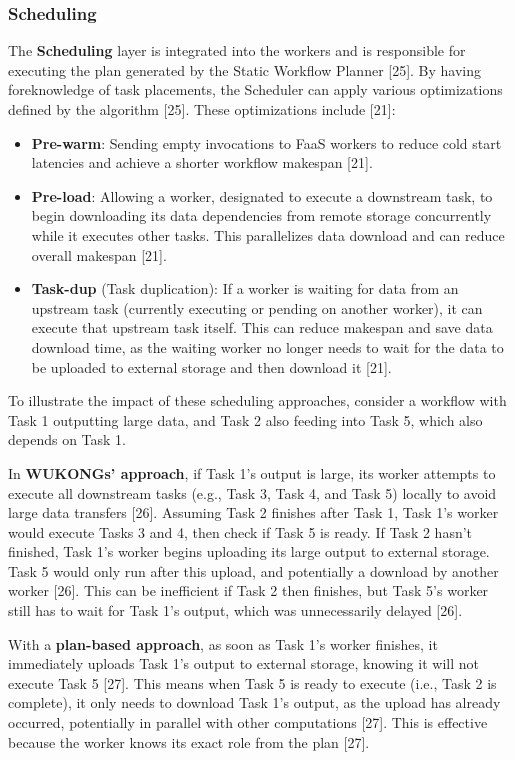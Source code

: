 \documentclass[conference]{IEEEtran}
\begin{document}
\subsubsection{Scheduling}
The \textbf{Scheduling} layer is integrated into the workers and is responsible for executing the plan generated by the Static Workflow Planner [25]. By having foreknowledge of task placements, the Scheduler can apply various optimizations defined by the algorithm [25]. These optimizations include [21]:
\begin{itemize}
    \item \textbf{Pre-warm}: Sending empty invocations to FaaS workers to reduce cold start latencies and achieve a shorter workflow makespan [21].
    \item \textbf{Pre-load}: Allowing a worker, designated to execute a downstream task, to begin downloading its data dependencies from remote storage concurrently while it executes other tasks. This parallelizes data download and can reduce overall makespan [21].
    \item \textbf{Task-dup} (Task duplication): If a worker is waiting for data from an upstream task (currently executing or pending on another worker), it can execute that upstream task itself. This can reduce makespan and save data download time, as the waiting worker no longer needs to wait for the data to be uploaded to external storage and then download it [21].
\end{itemize}

To illustrate the impact of these scheduling approaches, consider a workflow with Task 1 outputting large data, and Task 2 also feeding into Task 5, which also depends on Task 1.

In \textbf{WUKONGs' approach}, if Task 1's output is large, its worker attempts to execute all downstream tasks (e.g., Task 3, Task 4, and Task 5) locally to avoid large data transfers [26]. Assuming Task 2 finishes after Task 1, Task 1's worker would execute Tasks 3 and 4, then check if Task 5 is ready. If Task 2 hasn't finished, Task 1's worker begins uploading its large output to external storage. Task 5 would only run after this upload, and potentially a download by another worker [26]. This can be inefficient if Task 2 then finishes, but Task 5's worker still has to wait for Task 1's output, which was unnecessarily delayed [26].

With a \textbf{plan-based approach}, as soon as Task 1's worker finishes, it immediately uploads Task 1's output to external storage, knowing it will not execute Task 5 [27]. This means when Task 5 is ready to execute (i.e., Task 2 is complete), it only needs to download Task 1's output, as the upload has already occurred, potentially in parallel with other computations [27]. This is effective because the worker knows its exact role from the plan [27].
\end{document}
